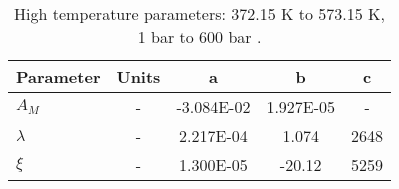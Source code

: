 \begin{table}[H]
    \caption{High   temperature parameters: 372.15 K to 573.15 K, 1 bar  to 600 bar \cite{Spycher2009}.}
    \centering 
    \label{table:ActDataHigh}
    \begin{tabular}{|p{6em} c c c c |}
        \hline
        \rowcolor{bluepoli!40} %
        \textbf{Parameter}& \textbf{Units} & \textbf{a} & \textbf{b} & \textbf{c}\T\B \\
        \hline \hline
        \(A_M\) & - & -3.084E-02 & 1.927E-05 & - \T\B\\
        \(\lambda\) & - & 2.217E-04 & 1.074 & 2648 \T\B \\

        \(\xi\) & - & 1.300E-05 & -20.12 & 5259 \B\\
        \hline
    \end{tabular}
    \\[10pt]
\end{table}